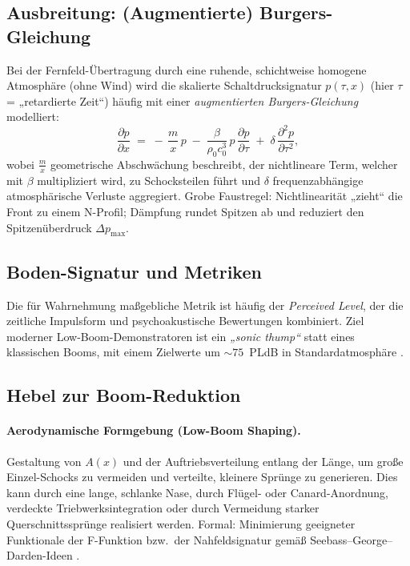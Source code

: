 \subsection{Ausbreitung: (Augmentierte) Burgers-Gleichung}
Bei der Fernfeld-Übertragung durch eine ruhende, schichtweise homogene
Atmosphäre (ohne Wind) wird die skalierte Schaltdrucksignatur $p(\tau,x)$
(hier $\tau$ = „retardierte Zeit“) häufig mit einer \emph{augmentierten Burgers-Gleichung}
modelliert:
\begin{equation}
  \frac{\partial p}{\partial x}
  \;=\;
  -\,\frac{m}{x}\,p
  \;-\;\frac{\beta}{\rho_0 c_0^{3}}\,p\,\frac{\partial p}{\partial \tau}
  \;+\;\delta\,\frac{\partial^2 p}{\partial \tau^2},
  \label{eq:aug-burgers}
\end{equation}
wobei $\frac{m}{x}$ geometrische Abschwächung beschreibt, der nichtlineare
Term, welcher mit $\beta$ multipliziert wird, zu Schocksteilen führt und
$\delta$ frequenzabhängige atmosphärische Verluste aggregiert.
Grobe Faustregel: Nichtlinearität „zieht“ die Front zu einem N-Profil;
Dämpfung rundet Spitzen ab und reduziert den Spitzenüberdruck
$\Delta p_\mathrm{max}$\cite{schall:rallabhandi2023,schall:rallabhandiAIAA2023,schall:burgersJASA}.

\subsection{Boden-Signatur und Metriken}
Die für Wahrnehmung maßgebliche Metrik ist häufig der \emph{Perceived Level},
der die zeitliche Impulsform und psychoakustische Bewertungen kombiniert.
Ziel moderner Low-Boom-Demonstratoren ist ein \emph{„sonic thump“} statt
eines klassischen Booms, mit einem Zielwerte um
${\sim}75$\ PLdB in Standardatmosphäre \cite{schall:x59pldb}.

\subsection{Hebel zur Boom-Reduktion}
\paragraph{Aerodynamische Formgebung (Low-Boom Shaping).}
Gestaltung von $A(x)$ und der Auftriebsverteilung entlang der Länge,
um große Einzel-Schocks zu vermeiden und verteilte, kleinere Sprünge zu generieren.
Dies kann durch eine lange, schlanke Nase, durch Flügel- oder Canard-Anordnung,
verdeckte Triebwerksintegration oder durch Vermeidung starker
Querschnittssprünge realisiert werden.
Formal: Minimierung geeigneter Funktionale der F-Funktion bzw.\ der Nahfeldsignatur
gemäß Seebass–George–Darden-Ideen \cite{schall:seebassgeorge,schall:darden75}.

